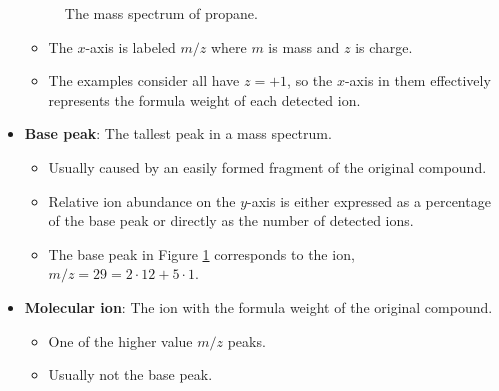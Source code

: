 \documentclass[../notes.tex]{subfiles}
\begin{document}
\begin{itemize}
\begin{figure}[h!]
        \caption{The mass spectrum of propane.}
        \label{fig:MSpropane}
    \end{figure}
    \begin{itemize}
        \item The $x$-axis is labeled $m/z$ where $m$ is mass and $z$ is charge.
        \item The examples \textcite{bib:SolomonsEtAl} consider all have $z=+1$, so the $x$-axis in them effectively represents the formula weight of each detected ion.
    \end{itemize}
    \item \textbf{Base peak}: The tallest peak in a mass spectrum.
    \begin{itemize}
        \item Usually caused by an easily formed fragment of the original compound.
        \item Relative ion abundance on the $y$-axis is either expressed as a percentage of the base peak or directly as the number of detected ions.
        \item The base peak in Figure \ref{fig:MSpropane} corresponds to the  ion, $m/z=29=2\cdot 12+5\cdot 1$.
    \end{itemize}
    \item \textbf{Molecular ion}: The ion with the formula weight of the original compound.
    \begin{itemize}
        \item One of the higher value $m/z$ peaks.
        \item Usually not the base peak.

\end{itemize}
\end{itemize}
\end{document}
